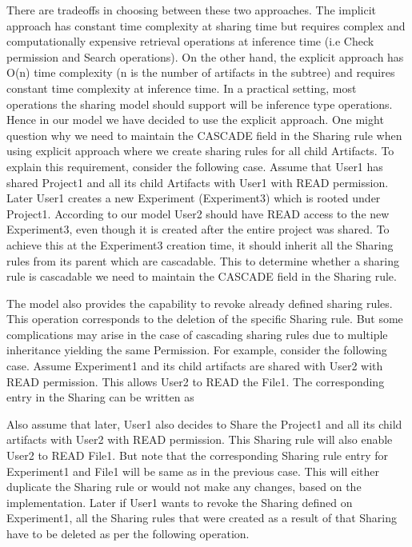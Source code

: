 \documentclass[sigconf]{acmart}
\begin{document}
There are tradeoffs in choosing between these two approaches. The implicit approach has constant time complexity at sharing time but requires complex and computationally expensive retrieval operations at inference time (i.e Check permission and Search operations). On the other hand, the explicit approach has O(n) time complexity (n is the number of artifacts in the subtree) and requires constant time complexity at inference time. In a practical setting, most operations the sharing model should support will be inference type operations. Hence in our model we have decided to use the explicit approach.
One might question why we need to maintain the CASCADE field in the Sharing rule when using explicit approach where we create sharing rules for all child Artifacts. To explain this requirement, consider the following case. Assume that User1 has shared Project1 and all its child Artifacts with User1 with READ permission. Later User1 creates a new Experiment (Experiment3) which is rooted under Project1. According to our model User2 should have READ access to the new Experiment3, even though it is created after the entire project was shared. To achieve this at the Experiment3 creation time, it should inherit all the Sharing rules from its parent which are cascadable. This to determine whether a sharing rule is cascadable we need to maintain the CASCADE field in the Sharing rule.

The model also provides the capability to revoke already defined sharing rules. This operation corresponds to the deletion of the specific Sharing rule. But some complications may arise in the case of cascading sharing rules due to multiple inheritance yielding the same Permission. For example, consider the following case. Assume Experiment1 and its child artifacts are shared with User2 with READ permission. This allows User2 to READ the File1. The corresponding entry in the Sharing can be written as

Also assume that later, User1 also decides to Share the Project1 and all its child artifacts with User2 with READ permission. This Sharing rule will also enable User2 to READ File1. But note that the corresponding Sharing rule entry for Experiment1 and File1 will be same as in the previous case. This will either duplicate the Sharing rule or would not make any changes, based on the implementation. Later if User1 wants to revoke the Sharing defined on Experiment1, all the Sharing rules that were created as a result of that Sharing have to be deleted as per the following operation.
\end{document}
